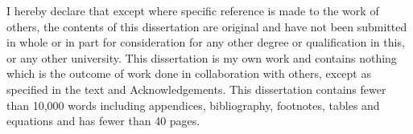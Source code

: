 
\begin{declaration}

    I hereby declare that except where specific reference is made to the work of
    others, the contents of this dissertation are original and have not been
    submitted in whole or in part for consideration for any other degree or
    qualification in this, or any other university. This dissertation is my own
    work and contains nothing which is the outcome of work done in collaboration
    with others, except as specified in the text and Acknowledgements. This
    dissertation contains fewer than 10,000 words including appendices,
    bibliography, footnotes, tables and equations and has fewer than 40 pages.


\end{declaration}

